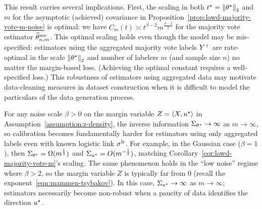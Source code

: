 This result carries several implications. First, the scaling in both $t^\star
= \left\|{\theta^\star}\right\|_2$ and $m$ for the asymptotic (achieved) covariance in
Proposition~\ref{prop:lowd-majority-vote-m-noise} is optimal: we have
$C_m(t) \asymp t^{\beta - 2} m^{\frac{\beta - 2}{2}}$ for the majority vote
estimator $\widehat{\theta}^{\textup{mv}}_{n,m}$.
%
This optimal scaling holds even though the model
may be mis-specified: estimators using the aggregated majority vote labels
$Y^+$ are rate-optimal in the scale $\left\|{\theta^\star}\right\|_2$ and number of
labelers $m$ (and sample size $n$) no matter the margin-based loss.
(Achieving the optimal constant requires a well-specified loss.)
This robustness of estimators using aggregated data may motivate
data-cleaning measures in dataset construction when it is difficult
to model the particulars of the data generation process.

For any noise scale $\beta > 0$ on
the margin variable $Z = \langle X, u^\star\rangle$ in
Assumption~\ref{assumption:z-density}, the inverse information
$\Sigma_{\theta^\star} \to \infty$ as $m \to \infty$, so calibration
becomes fundamentally harder for estimators using only aggregated labels
even with known logistic link $\sigma^{\textup{lr}}$.
%
For example, in the Gaussian
case ($\beta = 1$), then $\Sigma_{\theta^\star} = \Omega(m^{\frac{1}{2}})$ and
$\Sigma_{u^\star} = O(m^{-\frac{1}{2}})$, matching
Corollary~\ref{cor:lowd-majority-vote-m}'s scaling.
%
The same phenomenon holds in
the ``low noise'' regime where $\beta > 2$, so the margin
variable $Z$ is typically far from 0 (recall the
exponent~\eqref{eqn:mammen-tsybakov}).
%
In this case, $\Sigma_{u^\star} \to \infty$ as $m \to \infty$; estimators
necessarily become non-robust when a paucity of data identifies the direction
$u^\star$.

